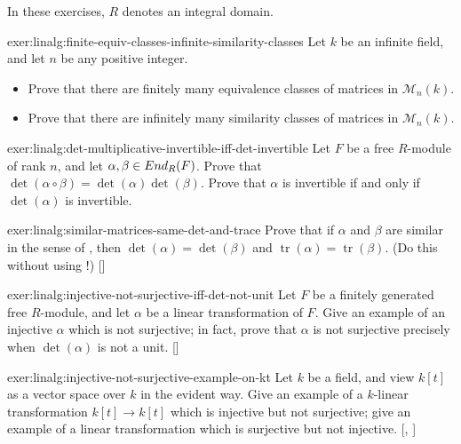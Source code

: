 In these exercises, $R$ denotes an integral domain.
\begin{exer}{}{exer:linalg:finite-equiv-classes-infinite-similarity-classes}
  Let $k$ be an infinite field, and let $n$ be any positive integer.
  \begin{itemize}
  \item Prove that there are finitely many equivalence classes of
    matrices in $\mathcal{M}_n(k)$.
  \item Prove that there are infinitely many similarity classes of
    matrices in $\mathcal{M}_n(k)$.
  \end{itemize}
\end{exer}
\begin{exer}{}{exer:linalg:det-multiplicative-invertible-iff-det-invertible}
  Let $F$ be a free $R$-module of rank $n$, and let
  $\alpha, \beta \in End_R(F)$. Prove that
  $\det(\alpha \circ \beta) = \det(\alpha)\det(\beta)$. Prove that
  $\alpha$ is invertible if and only if $\det(\alpha)$ is invertible.
\end{exer}
\begin{exer}{\exerused}{exer:linalg:similar-matrices-same-det-and-trace}
  Prove that if $\alpha$ and $\beta$ are similar in the sense of
  , then $\det(\alpha) = \det(\beta)$ and
  $\operatorname{tr}(\alpha) = \operatorname{tr}(\beta)$.  (Do this
  without using !)
  []
\end{exer}
\begin{exer}{\exerused}{exer:linalg:injective-not-surjective-iff-det-not-unit}
  Let $F$ be a finitely generated free $R$-module, and let $\alpha$ be
  a linear transformation of $F$. Give an example of an injective
  $\alpha$ which is not surjective; in fact, prove that $\alpha$ is
  not surjective precisely when $\det(\alpha)$ is not a
  unit. []
\end{exer}
\begin{exer}{\exerused}{exer:linalg:injective-not-surjective-example-on-kt}
  Let $k$ be a field, and view $k[t]$ as a vector space over $k$ in
  the evident way. Give an example of a $k$-linear transformation
  $k[t] \to k[t]$ which is injective but not surjective; give an
  example of a linear transformation which is surjective but not
  injective.
  [,
  ]
\end{exer}
